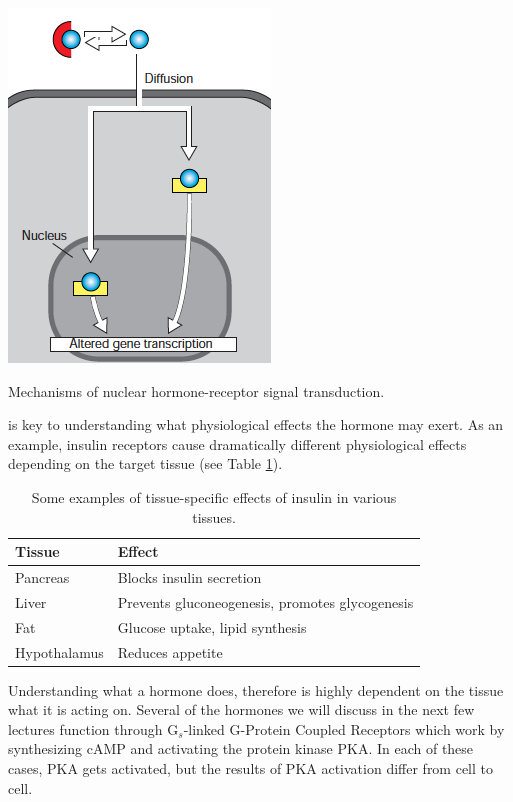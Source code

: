 \documentclass{tufte-handout}
\begin{document}
\begin{marginfigure}[-14cm]
  \includegraphics{figures/nuclear-hormone-receptors}
  \caption{Mechanisms of nuclear hormone-receptor signal transduction.}
    \label{fig:nuclear-hormone-receptors}
\end{marginfigure}

 is key to understanding what physiological effects the hormone may exert.  As an example, insulin receptors cause dramatically different physiological effects depending on the target tissue (see Table \ref{tab:insulin-tissue-roles}).

\begin{table}
  \centering
  \begin{tabular}{ll}
    \toprule
    Tissue & Effect \\
    \midrule
    Pancreas & Blocks insulin secretion \\
    Liver & Prevents gluconeogenesis, promotes glycogenesis\\
    Fat & Glucose uptake, lipid synthesis \\
    Hypothalamus & Reduces appetite \\
    \bottomrule
  \end{tabular}
  \caption{Some examples of tissue-specific effects of insulin in various tissues.}
  \label{tab:insulin-tissue-roles}
\end{table}

Understanding what a hormone does, therefore is highly dependent on the tissue what it is acting on.  Several of the hormones we will discuss in the next few lectures function through G$_{s}$-linked G-Protein Coupled Receptors which work by synthesizing cAMP and activating the protein kinase PKA.  In each of these cases, PKA gets activated, but the results of PKA activation differ from cell to cell.
\end{document}
